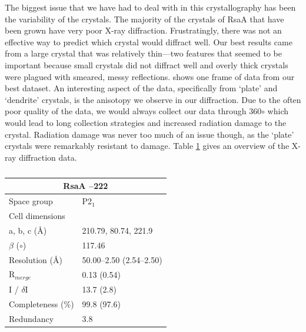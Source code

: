 The biggest issue that we have had to deal with in this crystallography has been the variability of the crystals. The majority of the crystals of RsaA that have been grown have very poor X-ray diffraction. Frustratingly, there was not an effective way to predict which crystal would diffract well. Our best results came from a large crystal that was relatively thin---two features that seemed to be important because small crystals did not diffract well and overly thick crystals were plagued with smeared, messy reflections.  shows one frame of data from our best dataset. An interesting aspect of the data, specifically from `plate' and `dendrite' crystals, is the anisotopy we observe in our diffraction. Due to the often poor quality of the data, we would always collect our data through 360$\circ$ which would lead to long collection strategies and increased radiation damage to the crystal. Radiation damage was never too much of an issue though, as the `plate' crystals were remarkably resistant to damage. Table \ref{tab:diffractiondata} gives an overview of the X-ray diffraction data.

        \begin{table}[p]
            \caption[Summary data from our X-ray diffraction of RsaA --222]{ }
            \begin{center}
                \begin{tabular}{@{}ll@{}}
                    \toprule
										\multicolumn{2}{c}{RsaA \del 0--222}			 \\ \midrule
										Space group				& P2$_{1}$							 \\
										Cell dimensions		&												 \\
										a, b, c (\AA)				& 210.79, 80.74, 221.9	 \\
										$\beta$ ($\circ$)							& 117.46								 \\
										Resolution (\AA)		& 50.00--2.50 (2.54--2.50) \\
										R$_{merge}$				& 0.13 (0.54)						 \\
										I / $\delta$I						 & 13.7 (2.8)							\\
										Completeness (\%) & 99.8 (97.6)						\\
										Redundancy				& 3.8										 \\ \bottomrule
               \end{tabular}
            \end{center}
            \label{tab:diffractiondata}
        \end{table}   
 
